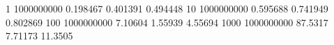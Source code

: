 1 1000000000 0.198467 0.401391 0.494448
10 1000000000 0.595688 0.741949 0.802869
100 1000000000 7.10604 1.55939 4.55694
1000 1000000000 87.5317 7.71173 11.3505
